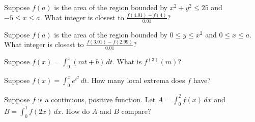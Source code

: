 \documentclass{ximera}
\newcommand{\recommendation}[1]{}
\begin{document}
\begin{shuffle}


\begin{problem}
  Suppose $f(a)$ is the area of the region bounded by $x^2 + y^2 \leq 25$ and $-5 \leq x \leq a$.  What integer is closest to $\frac{f(4.01) - f(4)}{0.01}$?
  \begin{multipleChoice}
  \end{multipleChoice}
\end{problem}

\begin{problem}
  Suppose $f(a)$ is the area of the region bounded by $0 \leq y \leq x^2$ and $0 \leq x \leq a$.  What integer is closest to $\frac{f(3.01) - f(2.99)}{0.01}$?
  \begin{multipleChoice}
  \end{multipleChoice}
\end{problem}

\begin{problem}
  Suppose $f(x) = \int_0^x \left( mt + b \right) \, dt$.  What is $f^{(3)}(m)$?
  \begin{multipleChoice}
  \end{multipleChoice}
\end{problem}

\begin{problem}
  Suppose $f(x) = \int_0^x e^{t^2} \, dt$.  How many local extrema does $f$ have?
  \begin{multipleChoice}
  \end{multipleChoice}
\end{problem}



\begin{problem}
  Suppose $f$ is a continuous, positive function.  Let $A = \int_0^2 f(x) \, dx$ and $B = \int_0^1 f(2x) \, dx$.  How do $A$ and $B$ compare?
  \begin{multipleChoice}
  \end{multipleChoice}
\end{problem}


\end{shuffle}
\end{document}
